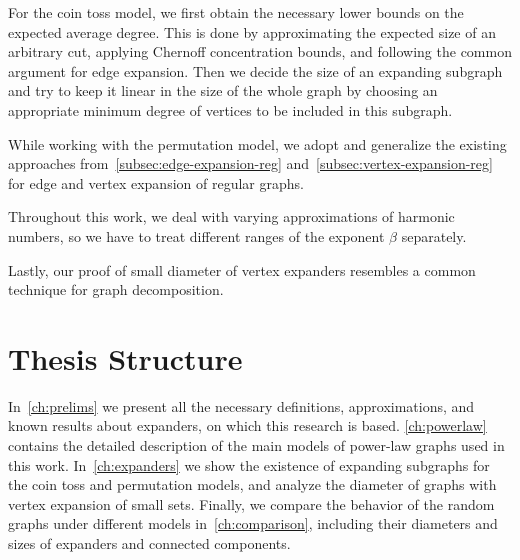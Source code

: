 For the coin toss model, we first obtain the necessary lower bounds
on the expected average degree. This is done by approximating
the expected size of an arbitrary cut, applying Chernoff concentration bounds,
and following the common argument for edge expansion.
Then we decide the size of an expanding subgraph and try to keep it linear
in the size of the whole graph by choosing an appropriate minimum degree
of vertices to be included in this subgraph.

While working with the permutation model, we adopt and generalize
the existing approaches from~\autoref{subsec:edge-expansion-reg}
and~\ref{subsec:vertex-expansion-reg}
for edge and vertex expansion of regular graphs.

Throughout this work, we deal with varying approximations of harmonic numbers,
so we have to treat different ranges of the exponent $\beta$ separately.

Lastly, our proof of small diameter of vertex expanders resembles
a common technique for graph decomposition.

\section{Thesis Structure}

In~\autoref{ch:prelims} we present all the necessary definitions,
approximations, and known results about expanders,
on which this research is based.
\autoref{ch:powerlaw} contains the detailed description
of the main models of power-law graphs used in this work.
In~\autoref{ch:expanders} we show the existence of expanding subgraphs
for the coin toss and permutation models,
and analyze the diameter of graphs with vertex expansion of small sets.
Finally, we compare the behavior of the random graphs
under different models in~\autoref{ch:comparison}, including their
diameters and sizes of expanders and connected components.
